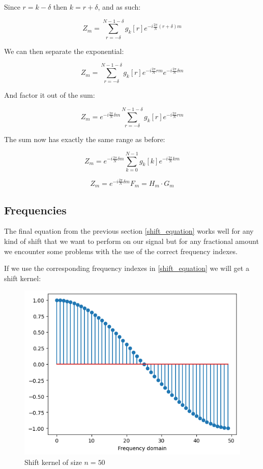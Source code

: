 \documentclass[]{usiinfbachelorproject}
\begin{document}
	Since $r = k - \delta$ then $ k = r + \delta$, and as such:
	
	\begin{equation*}
		Z_m = \displaystyle\sum_{r= -\delta}^{N-1 - \delta}g_k[r]e^{-i \frac{2\pi}{N} (r + \delta)m}
	\end{equation*}
	
	We can then separate the exponential:
	
	\begin{equation*}
		Z_m = \displaystyle\sum_{r= -\delta}^{N-1 - \delta}g_k[r]e^{-i \frac{2\pi}{N} rm}e^{-i \frac{2\pi}{N}  \delta m}
	\end{equation*}
	
	And factor it out of the sum:
	
	\begin{equation*}
		Z_m = e^{-i \frac{2\pi}{N}  \delta m} \displaystyle\sum_{r= -\delta}^{N-1 - \delta}g_k[r]e^{-i \frac{2\pi}{N} rm}
	\end{equation*}
	
	The sum now has exactly the same range as before:
	
	\begin{equation*}
		Z_m = e^{-i \frac{2\pi}{N}  \delta m} \displaystyle\sum_{k=0}^{N-1}g_k[k]e^{-i \frac{2\pi}{N} km}
	\end{equation*}
	
	\begin{equation}
		Z_m = e^{-i \frac{2\pi}{N}  \delta m} F_m = H_m \cdot G_m \label{shift_equation}
	\end{equation}
	
	\subsection{Frequencies}
	The final equation from the previous section \ref{shift_equation} works well for any kind of shift that we want to perform on our signal but for any fractional amount we encounter some problems with the use of the correct frequency indexes.
	
	If we use the corresponding frequency indexes in \ref{shift_equation} we will get a shift kernel:
	\begin{figure}[h]
		\centering
		\includegraphics[width=0.5\columnwidth]{images/Results/phase_shift_bad.png}
		\caption{Shift kernel of size $n=50$}
	\end{figure}
	
\end{document}
